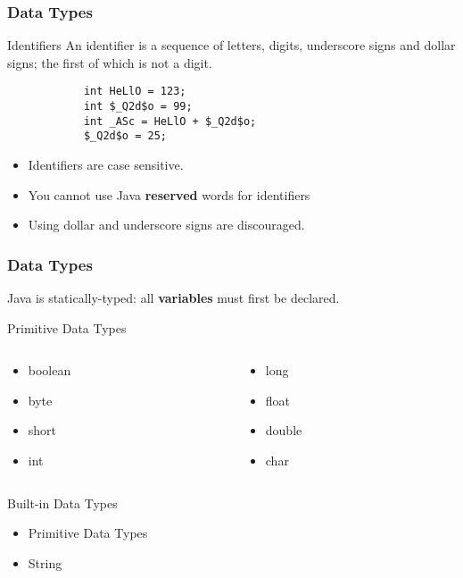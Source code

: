 \documentclass[10pt, compress]{beamer}
\begin{document}
\begin{frame}[fragile]
	\frametitle{Data Types}
	\begin{block}{Identifiers}
		An identifier is a sequence of letters, digits, underscore signs and dollar signs; the first of which is not a digit.
		\begin{verbatim}
			int HeLlO = 123;
			int $_Q2d$o = 99;
			int _ASc = HeLlO + $_Q2d$o;
			$_Q2d$o = 25;
		\end{verbatim}
	\end{block}
	\begin{itemize}
		\item[] Identifiers are case sensitive.
		\item[] You cannot use Java \textbf{reserved} words for identifiers
		\item[] Using dollar and underscore signs are discouraged.
	\end{itemize}
\end{frame}

\begin{frame}[fragile]
	\frametitle{Data Types}
	Java is statically-typed: all \textbf{variables} must first be declared.
	\begin{block}{Primitive Data Types}
		\begin{columns}
		\begin{column}{0.5\textwidth}
			\begin{itemize}
				\item[] boolean
				\item[] byte
				\item[] short
				\item[] int
			\end{itemize}
		\end{column}
		\begin{column}{0.5\textwidth}
			\begin{itemize}
				\item[] long
				\item[] float
				\item[] double
				\item[] char
			\end{itemize}
		\end{column}
		\end{columns}
	\end{block}
	\begin{block}{Built-in Data Types}
		\begin{itemize}
			\item[] Primitive Data Types
			\item[] String
		\end{itemize}
	\end{block}
\end{frame}
\end{document}
